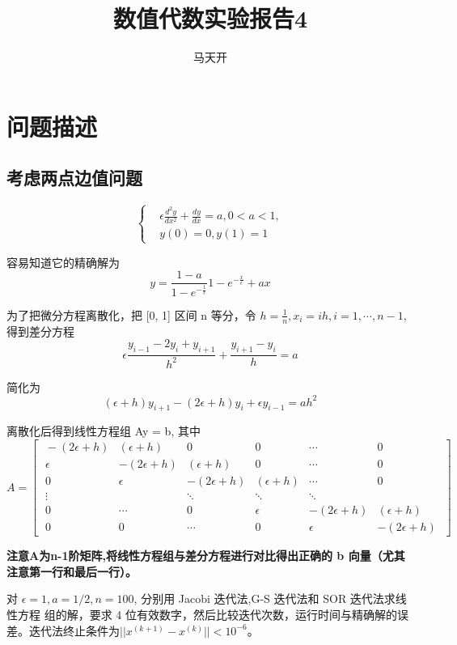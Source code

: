\documentclass{article}
\title{数值代数实验报告4}
\author{马天开}
\begin{document}
\maketitle

\section{问题描述}
\subsection{考虑两点边值问题}
\[
    \left\{
        \begin{aligned}
        & \epsilon \frac{d^2y}{dx^2}+\frac{dy}{dx}=a , 0 < a < 1, \\
        & y(0) = 0, y(1) = 1
        \end{aligned}
    \right.
\]

容易知道它的精确解为
\[
    y=\frac{1-a}{1-e^{-\frac{1}{\epsilon}}}1-e^{-\frac{x}{\epsilon}}+ax
    \]

为了把微分方程离散化，把 [0, 1] 区间 n 等分，令 $h = \frac{1}{n}, x_i = ih, i = 1,\cdots, n-1$, 得到差分方程
\[
    \epsilon \frac{y_{i-1}-2y_i+y_{i+1}}{h^2}+\frac{y_{i+1}-y_i}{h}=a
\]

简化为
\[
    (\epsilon + h)y_{i+1}-(2\epsilon + h)y_i + \epsilon y_{i-1} = ah^2
\]

离散化后得到线性方程组 Ay = b, 其中
\[
    A=\begin{bmatrix}
    \;-(2\epsilon + h) & (\epsilon + h) & 0 & 0 & \cdots & 0 \;\\
    \;\epsilon & -(2\epsilon + h) & (\epsilon + h) & 0 & \cdots & 0 \;\\
    \;0 & \epsilon & -(2\epsilon + h) & (\epsilon + h) & \cdots & 0 \;\\
    \;\vdots & & \ddots & \ddots & \ddots \;\\
    \;0 & \cdots & 0 & \epsilon & -(2\epsilon + h) & (\epsilon + h)\;\\
    \;0 & 0 & \cdots & 0 & \epsilon & -(2\epsilon + h)\;
    \end{bmatrix}
\]

\textbf{注意A为n-1阶矩阵,将线性方程组与差分方程进行对比得出正确的 b 向量（尤其注意第一行和最后一行）。}

对 $\epsilon = 1, a = 1/2, n = 100$, 分别用 Jacobi 迭代法,G-S 迭代法和 SOR 迭代法求线性方程
组的解，要求 4 位有效数字，然后比较迭代次数，运行时间与精确解的误差。迭代法终止条件为$||x^{(k+1)}-x^{(k)}|| < 10^{-6}$。
\end{document}
